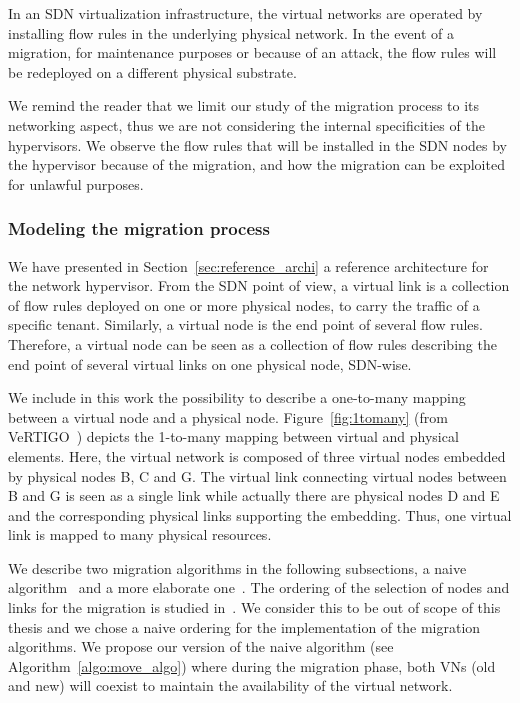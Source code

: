 \label{sec:migration}
In an SDN virtualization infrastructure, the virtual networks are operated by installing flow rules in the underlying physical network.
In the event of a migration, for maintenance purposes or because of an attack, the flow rules will be redeployed on a different physical substrate.

We remind the reader that we limit our study of the migration process to its networking aspect, thus we are not considering the internal specificities of the hypervisors.
We observe the flow rules that will be installed in the SDN nodes by the hypervisor because of the migration, and how the migration can be exploited for unlawful purposes.



\subsubsection{Modeling the migration process}
We have presented in Section~\ref{sec:reference_archi} a reference architecture for the network hypervisor.
From the SDN point of view, a virtual link is a collection of flow rules deployed on one or more physical nodes, to carry the traffic of a specific tenant.
Similarly, a virtual node is the end point of several flow rules.
Therefore, a virtual node can be seen as a collection of flow rules describing the end point of several virtual links on one physical node, SDN-wise.

We include in this work the possibility to describe a one-to-many mapping between a virtual node and a physical node.
Figure~\ref{fig:1tomany} (from VeRTIGO~\cite{VeRTIGO-Corin2012a}) depicts the 1-to-many mapping between virtual and physical elements. Here, the virtual network is composed of three virtual nodes embedded by physical nodes B, C and G.
The virtual link connecting virtual nodes between B and G is seen as a single link while actually there are physical nodes D and E and the corresponding physical links supporting the embedding.
Thus, one virtual link is mapped to many physical resources.

We describe two migration algorithms in the following subsections, a naive algorithm~\cite{Lime-Ghorbani2014} and a more elaborate one~\cite{vnm-lo2013}. 
The ordering of the selection of nodes and links for the migration is studied in~\cite{vnm-lo2013}. 
We consider this to be out of scope of this thesis and we chose a naive ordering for the implementation of the migration algorithms.
We propose our version of the naive algorithm (see Algorithm~\ref{algo:move_algo}) where during the migration phase, both VNs (old and new) will coexist to maintain the availability of the virtual network.


